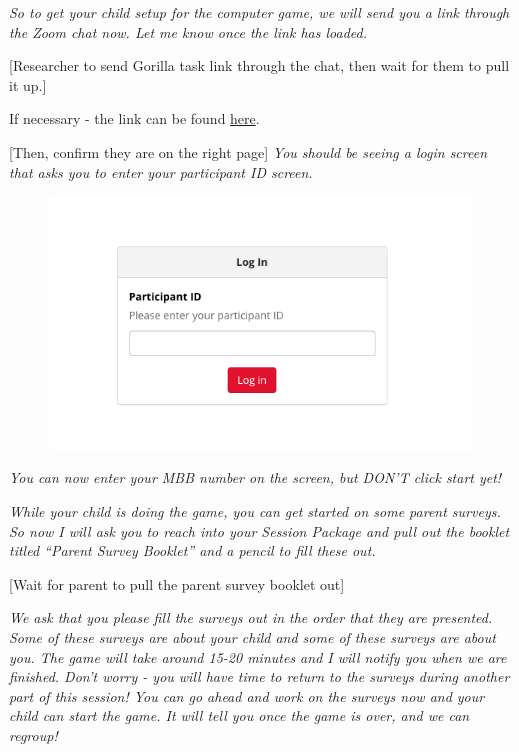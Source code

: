 \documentclass[]{book}
\begin{document}
\emph{So to get your child setup for the computer game, we will send you a link through the Zoom chat now. Let me know once the link has loaded.}

{[}Researcher to send Gorilla task link through the chat, then wait for them to pull it up.{]}

If necessary - the link can be found \href{https://research.sc/participant/login/20451/publicid}{here}.

{[}Then, confirm they are on the right page{]} \emph{You should be seeing a login screen that asks you to enter your participant ID screen.}

\begin{figure}
\centering
\includegraphics{images/halloween/7.png}
\caption{}
\end{figure}

\emph{You can now enter your MBB number on the screen, but DON'T click start yet!}

\emph{While your child is doing the game, you can get started on some parent surveys. So now I will ask you to reach into your Session Package and pull out the booklet titled ``Parent Survey Booklet'' and a pencil to fill these out.}

{[}Wait for parent to pull the parent survey booklet out{]}

\emph{We ask that you please fill the surveys out in the order that they are presented. Some of these surveys are about your child and some of these surveys are about you. The game will take around 15-20 minutes and I will notify you when we are finished. Don't worry - you will have time to return to the surveys during another part of this session! You can go ahead and work on the surveys now and your child can start the game. It will tell you once the game is over, and we can regroup!}
\end{document}
